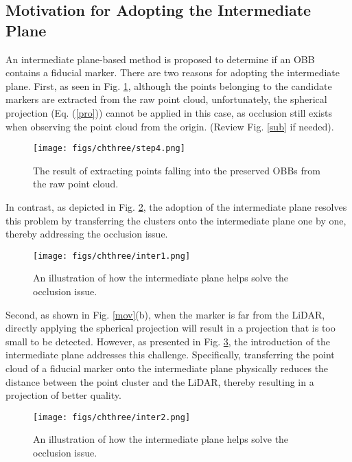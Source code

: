 \subsection{Motivation for Adopting the Intermediate Plane}
An intermediate plane-based method is proposed to determine if an OBB contains a fiducial marker. There are two reasons for adopting the intermediate plane. First, as seen in Fig. \ref{step4}, although the points belonging to the candidate markers are extracted from the raw point cloud, unfortunately, the spherical projection (Eq. (\ref{pro})) cannot be applied in this case, as occlusion still exists when observing the point cloud from the origin. (Review Fig. \ref{sub} if needed). 
\begin{figure}[H] 
	\centering
\texttt{[image: figs/chthree/step4.png]}
	\caption{The result of extracting points falling into the preserved OBBs from the raw point cloud.}
	\label{step4}
\end{figure} 
In contrast, as depicted in Fig. \ref{inter1}, the adoption of the intermediate plane resolves this problem by transferring the clusters onto the intermediate plane one by one, thereby addressing the occlusion issue.
\begin{figure}[H] 
	\centering
\texttt{[image: figs/chthree/inter1.png]}
	\caption{An illustration of how the intermediate plane helps solve the occlusion issue.}
	\label{inter1}
\end{figure} 
Second, as shown in Fig. \ref{mov}(b), when the marker is far from the LiDAR, directly applying the spherical projection will result in a projection that is too small to be detected. However, as presented in Fig. \ref{inter2}, the introduction of the intermediate plane addresses this challenge. Specifically, transferring the point cloud of a fiducial marker onto the intermediate plane physically reduces the distance between the point cluster and the LiDAR, thereby resulting in a projection of better quality.
\begin{figure}[H] 
	\centering
\texttt{[image: figs/chthree/inter2.png]}
	\caption{An illustration of how the intermediate plane helps solve the occlusion issue.}
	\label{inter2}
\end{figure} 
%
